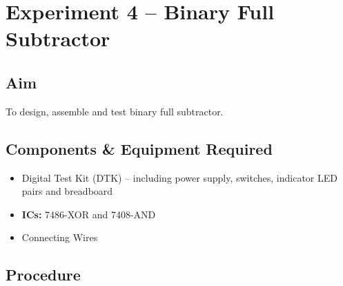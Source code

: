 \documentclass[11pt, a4paper]{article}
\begin{document}
\newpage

\section{Experiment 4 -- Binary Full Subtractor}

\subsection{Aim}
To design, assemble and test binary full subtractor. 

\subsection{Components \& Equipment Required}

\begin{itemize}
    \item Digital Test Kit (DTK) -- including power supply, switches, indicator LED pairs and breadboard
    \item \textbf{ICs:} 7486-XOR and 7408-AND
    \item Connecting Wires
\end{itemize}

\subsection{Procedure}
\end{document}
